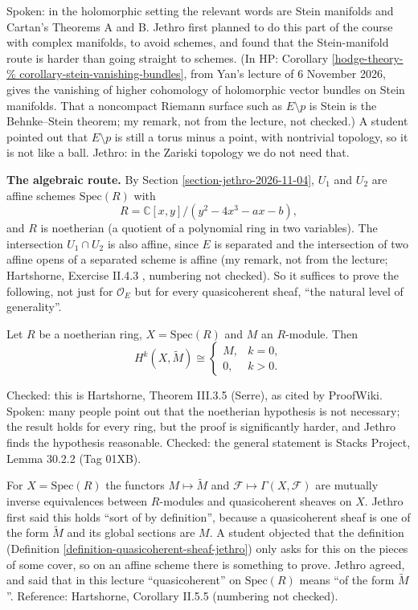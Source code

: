 Spoken: in the holomorphic setting the
relevant words are Stein manifolds and
Cartan's Theorems A and B. Jethro first
planned to do this part of the course with
complex manifolds, to avoid schemes, and
found
that the Stein-manifold route is harder than
going straight to schemes. (In HP: Corollary
\ref{hodge-theory-%
corollary-stein-vanishing-bundles}, from
Yan's lecture of 6 November 2026, gives the
vanishing of higher cohomology of
holomorphic vector bundles on Stein
manifolds. That a noncompact Riemann surface
such as $E\setminus p$ is Stein is the
Behnke--Stein theorem; my remark, not from
the lecture, not checked.) A student pointed
out that $E\setminus p$ is still a torus
minus a point, with nontrivial topology, so
it
is not like a ball. Jethro: in the Zariski
topology we do not need that.

\medskip\noindent
{\bf The algebraic route.} By Section
\ref{section-jethro-2026-11-04}, $U_1$ and
$U_2$ are affine schemes $\mathrm{Spec}(R)$
with
$$
R=\mathbb{C}[x,y]/(y^2-4x^3-ax-b),
$$
and $R$ is noetherian (a quotient of a
polynomial ring in two variables). The
intersection $U_1\cap U_2$ is also affine,
since $E$ is separated and the intersection
of two affine opens of a separated scheme is
affine (my remark, not from the lecture;
Hartshorne, Exercise II.4.3
\cite{har}, numbering not checked). So it
suffices to prove the
following, not just for $\mathcal{O}_E$ but
for every quasicoherent sheaf, ``the natural
level of generality''.

\begin{proposition}
\label{proposition-jethro-2026-11-09-affine}
Let $R$ be a noetherian ring,
$X=\mathrm{Spec}(R)$ and $M$ an $R$-module.
Then
$$
H^k(X,\widetilde{M})\cong
\begin{cases}
M, & k=0,\\
0, & k>0.
\end{cases}
$$
\end{proposition}

\noindent
Checked: this is Hartshorne, Theorem III.3.5
\cite{har} (Serre), as cited by ProofWiki.
Spoken: many people point out that the
noetherian hypothesis is not necessary; the
result holds for every ring, but the proof is
significantly harder, and Jethro finds the
hypothesis reasonable. Checked: the general
statement is Stacks Project, Lemma 30.2.2
(Tag 01XB).

\begin{remark}
\label{remark-jethro-2026-11-09-qcoh-modules}
For $X=\mathrm{Spec}(R)$ the functors
$M\mapsto\widetilde{M}$ and
$\mathcal{F}\mapsto\Gamma(X,\mathcal{F})$ are
mutually inverse equivalences between
$R$-modules and quasicoherent sheaves on $X$.
Jethro first said this holds ``sort of by
definition'', because a quasicoherent sheaf
is one of the form $\widetilde{M}$ and its
global sections are $M$. A student objected
that the definition (Definition
\ref{definition-quasicoherent-sheaf-jethro})
only asks for this on the pieces of some
cover, so on an affine scheme there is
something to prove. Jethro agreed, and said
that in this lecture ``quasicoherent'' on
$\mathrm{Spec}(R)$ means ``of the form
$\widetilde{M}$''. Reference: Hartshorne,
Corollary II.5.5 \cite{har} (numbering not
checked).
\end{remark}

